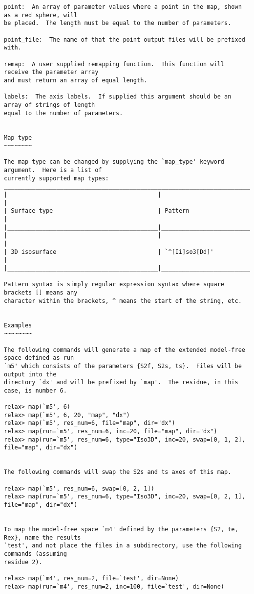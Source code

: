 {\begin{verbatim}
point:  An array of parameter values where a point in the map, shown as a red sphere, will
be placed.  The length must be equal to the number of parameters.

point_file:  The name of that the point output files will be prefixed with.

remap:  A user supplied remapping function.  This function will receive the parameter array
and must return an array of equal length.

labels:  The axis labels.  If supplied this argument should be an array of strings of length
equal to the number of parameters.


Map type
~~~~~~~~

The map type can be changed by supplying the `map_type' keyword argument.  Here is a list of
currently supported map types:
_____________________________________________________________________________
|                                           |                               |
| Surface type                              | Pattern                       |
|___________________________________________|_______________________________|
|                                           |                               |
| 3D isosurface                             | `^[Ii]so3[Dd]'                |
|___________________________________________|_______________________________|

Pattern syntax is simply regular expression syntax where square brackets [] means any
character within the brackets, ^ means the start of the string, etc.


Examples
~~~~~~~~

The following commands will generate a map of the extended model-free space defined as run
`m5' which consists of the parameters {S2f, S2s, ts}.  Files will be output into the
directory `dx' and will be prefixed by `map'.  The residue, in this case, is number 6.

relax> map(`m5', 6)
relax> map(`m5', 6, 20, "map", "dx")
relax> map(`m5', res_num=6, file="map", dir="dx")
relax> map(run=`m5', res_num=6, inc=20, file="map", dir="dx")
relax> map(run=`m5', res_num=6, type="Iso3D", inc=20, swap=[0, 1, 2], file="map", dir="dx")


The following commands will swap the S2s and ts axes of this map.

relax> map(`m5', res_num=6, swap=[0, 2, 1])
relax> map(run=`m5', res_num=6, type="Iso3D", inc=20, swap=[0, 2, 1], file="map", dir="dx")


To map the model-free space `m4' defined by the parameters {S2, te, Rex}, name the results
`test', and not place the files in a subdirectory, use the following commands (assuming
residue 2).

relax> map(`m4', res_num=2, file=`test', dir=None)
relax> map(run=`m4', res_num=2, inc=100, file=`test', dir=None)
\end{verbatim}
}




